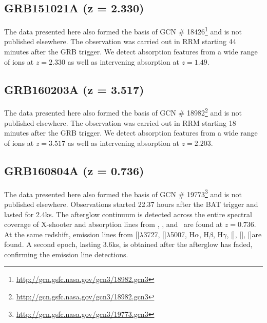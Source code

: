 \documentclass[iop, twocolappendix, numberedappendix, tighten, appendixfloats]{emulateapj}
\newcommand{\hb}{H$\beta$}
\newcommand{\ha}{H$\alpha$}
\newcommand{\hg}{H$\gamma$}
\newcommand{\sii}{[\ion{S}{2}]}
\newcommand{\siii}{[\ion{S}{3}]}
\newcommand{\oii}{[\ion{O}{2}]$\lambda$3727}
\newcommand{\oiii}{[\ion{O}{3}]$\lambda$5007}
\newcommand{\nii}{[\ion{N}{2}]}
\newcommand{\feii}{\ion{Fe}{2}}
\newcommand{\mgi}{\ion{Mg}{1}}
\newcommand{\mgii}{\ion{Mg}{2}}
\newcommand{\alii}{\ion{Al}{2}}
\begin{document}
	\subsection{GRB151021A (z = 2.330)}
	The data presented here also formed the basis of GCN \#
	18426\footnote{\url{http://gcn.gsfc.nasa.gov/gcn3/18982.gcn3}} and is not
	published elsewhere. The observation was carried out in RRM starting 44 minutes
	after the GRB trigger. We detect absorption features from a wide range of ions
	at $z=2.330$ as well as intervening absorption at $z=1.49$.

	\subsection{GRB160203A (z = 3.517)}
	The data presented here also formed the basis of GCN \#
	18982\footnote{\url{http://gcn.gsfc.nasa.gov/gcn3/18982.gcn3}} and is not
	published elsewhere. The observation was carried out in RRM starting 18 minutes
	after the GRB trigger. We detect absorption features from a wide range of ions
	at $z=3.517$ as well as intervening absorption at $z=2.203$.

	\subsection{GRB160804A (z = 0.736)}
	The data presented here also formed the basis of GCN \#
	19773\footnote{\url{http://gcn.gsfc.nasa.gov/gcn3/19773.gcn3}} and is not
	published elsewhere. Observations started 22.37 hours after the BAT trigger and
	lasted for 2.4ks. The afterglow continuum is detected across the entire
	spectral coverage of X-shooter and absorption lines from \mgi, \mgii, \feii and
	\alii~are found at $z = 0.736$. At the same redshift, emission lines from \oii,
	\oiii, \ha, \hb, \hg, \nii, \sii, \siii are found. A second epoch, lasting
	3.6ks, is obtained after the afterglow has faded, confirming the emission line
	detections.
	
\end{document}

